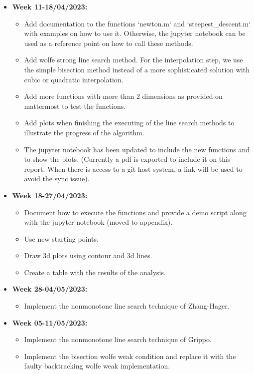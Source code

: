 \documentclass[a4paper,11pt]{article}
\numberwithin{equation}{section} %
\begin{document}
\begin{itemize}
    \item \textbf{Week 11-18/04/2023:} 
    \begin{itemize}
        \item Add documentation to the functions `newton.m` and `steepest\_descent.m` with examples on how to use it. Otherwise, the jupyter notebook can be used as a reference point on how to call these methods.
        \item Add wolfe strong line search method. For the interpolation step, we use the simple bisection method instead of a more sophisticated solution with cubic or quadratic interpolation.
        \item Add more functions with more than 2 dimensions as provided on mattermost to test the functions.
        \item Add plots when finishing the executing of the line search methods to illustrate the progress of the algorithm.
        \item The jupyter notebook has been updated to include the new functions and to show the plots. (Currently a pdf is exported to include it on this report. When there is access to a git host system, a link will be used to avoid the sync issue).
    \end{itemize}
    \item \textbf{Week 18-27/04/2023:}
    \begin{itemize}
        \item Document how to execute the functions and provide a demo script along with the jupyter notebook (moved to appendix).
        \item Use new starting points.
        \item Draw 3d plots using contour and 3d lines.
        \item Create a table with the results of the analysis.
    \end{itemize}
    \item \textbf{Week 28-04/05/2023:}
    \begin{itemize}
        \item Implement the nonmonotone line search technique of Zhang-Hager.
    \end{itemize}
    \item \textbf{Week 05-11/05/2023:}
    \begin{itemize}
        \item Implement the nonmonotone line search technique of Grippo.
        \item Implement the bisection wolfe weak condition and replace it with the faulty backtracking wolfe weak implementation.

\end{itemize}
\end{itemize}
\end{document}
